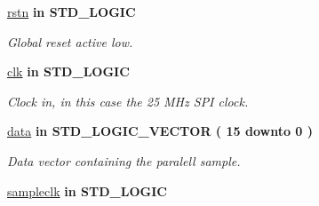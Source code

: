  \begin{DoxyCompactItemize}
\item 
\hypertarget{classDAC__SPI_aba021aec4b477b89079bb58ccadcc67e}{\hyperlink{classDAC__SPI_aba021aec4b477b89079bb58ccadcc67e}{rstn}  {\bfseries {\bfseries \textcolor{vhdlkeyword}{in}\textcolor{vhdlchar}{ }}} {\bfseries \textcolor{comment}{S\-T\-D\-\_\-\-L\-O\-G\-I\-C}\textcolor{vhdlchar}{ }} }\label{classDAC__SPI_aba021aec4b477b89079bb58ccadcc67e}

\begin{DoxyCompactList}\small\item\em Global reset active low. \end{DoxyCompactList}\item 
\hypertarget{classDAC__SPI_a8120037e0ee47c35ba2d79242209c72e}{\hyperlink{classDAC__SPI_a8120037e0ee47c35ba2d79242209c72e}{clk}  {\bfseries {\bfseries \textcolor{vhdlkeyword}{in}\textcolor{vhdlchar}{ }}} {\bfseries \textcolor{comment}{S\-T\-D\-\_\-\-L\-O\-G\-I\-C}\textcolor{vhdlchar}{ }} }\label{classDAC__SPI_a8120037e0ee47c35ba2d79242209c72e}

\begin{DoxyCompactList}\small\item\em Clock in, in this case the 25 M\-Hz S\-P\-I clock. \end{DoxyCompactList}\item 
\hypertarget{classDAC__SPI_a2cc65ad6f0f6d24cd3ebac8757953224}{\hyperlink{classDAC__SPI_a2cc65ad6f0f6d24cd3ebac8757953224}{data}  {\bfseries {\bfseries \textcolor{vhdlkeyword}{in}\textcolor{vhdlchar}{ }}} {\bfseries \textcolor{comment}{S\-T\-D\-\_\-\-L\-O\-G\-I\-C\-\_\-\-V\-E\-C\-T\-O\-R}\textcolor{vhdlchar}{ }\textcolor{vhdlchar}{(}\textcolor{vhdlchar}{ }\textcolor{vhdlchar}{ } \textcolor{vhdldigit}{15} \textcolor{vhdlchar}{ }\textcolor{vhdlchar}{ }\textcolor{vhdlchar}{ }\textcolor{vhdlkeyword}{downto}\textcolor{vhdlchar}{ }\textcolor{vhdlchar}{ }\textcolor{vhdlchar}{ } \textcolor{vhdldigit}{0} \textcolor{vhdlchar}{ }\textcolor{vhdlchar}{)}\textcolor{vhdlchar}{ }} }\label{classDAC__SPI_a2cc65ad6f0f6d24cd3ebac8757953224}

\begin{DoxyCompactList}\small\item\em Data vector containing the paralell sample. \end{DoxyCompactList}\item 
\hypertarget{classDAC__SPI_a4696bc4e06c727fae1b8ce3ba8cf08d4}{\hyperlink{classDAC__SPI_a4696bc4e06c727fae1b8ce3ba8cf08d4}{sampleclk}  {\bfseries {\bfseries \textcolor{vhdlkeyword}{in}\textcolor{vhdlchar}{ }}} {\bfseries \textcolor{comment}{S\-T\-D\-\_\-\-L\-O\-G\-I\-C}\textcolor{vhdlchar}{ }} }\label{classDAC__SPI_a4696bc4e06c727fae1b8ce3ba8cf08d4}


\end{DoxyCompactItemize}
